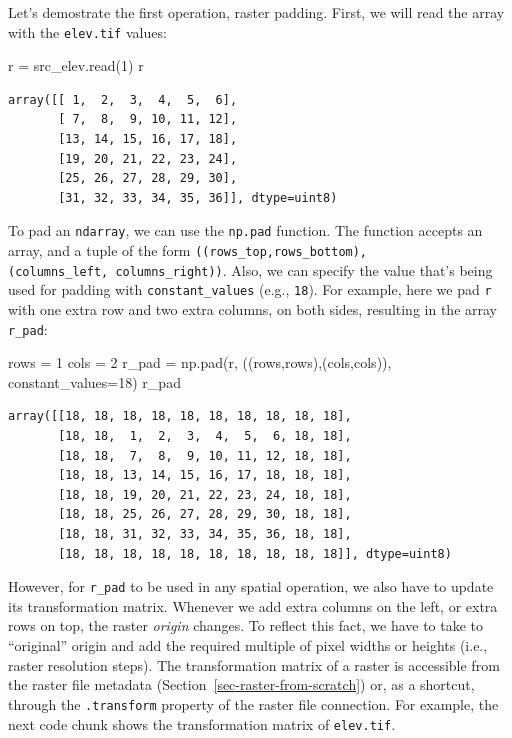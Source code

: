 \documentclass[
  letterpaper,
]{krantz}
\newenvironment{Shaded}{\begin{snugshade}}{\end{snugshade}}
\newcommand{\DecValTok}[1]{\textcolor[rgb]{0.68,0.00,0.00}{#1}}
\newcommand{\NormalTok}[1]{\textcolor[rgb]{0.00,0.23,0.31}{#1}}
\newcommand{\OperatorTok}[1]{\textcolor[rgb]{0.37,0.37,0.37}{#1}}
\begin{document}
Let's demostrate the first operation, raster padding. First, we will
read the array with the \texttt{elev.tif} values:

\begin{Shaded}
\begin{Highlighting}[]
\NormalTok{r }\OperatorTok{=}\NormalTok{ src\_elev.read(}\DecValTok{1}\NormalTok{)}
\NormalTok{r}
\end{Highlighting}
\end{Shaded}

\begin{verbatim}
array([[ 1,  2,  3,  4,  5,  6],
       [ 7,  8,  9, 10, 11, 12],
       [13, 14, 15, 16, 17, 18],
       [19, 20, 21, 22, 23, 24],
       [25, 26, 27, 28, 29, 30],
       [31, 32, 33, 34, 35, 36]], dtype=uint8)
\end{verbatim}

To pad an \texttt{ndarray}, we can use the \texttt{np.pad} function. The
function accepts an array, and a tuple of the form
\texttt{((rows\_top,rows\_bottom),(columns\_left,\ columns\_right))}.
Also, we can specify the value that's being used for padding with
\texttt{constant\_values} (e.g., \texttt{18}). For example, here we pad
\texttt{r} with one extra row and two extra columns, on both sides,
resulting in the array \texttt{r\_pad}:

\begin{Shaded}
\begin{Highlighting}[]
\NormalTok{rows }\OperatorTok{=} \DecValTok{1}
\NormalTok{cols }\OperatorTok{=} \DecValTok{2}
\NormalTok{r\_pad }\OperatorTok{=}\NormalTok{ np.pad(r, ((rows,rows),(cols,cols)), constant\_values}\OperatorTok{=}\DecValTok{18}\NormalTok{)}
\NormalTok{r\_pad}
\end{Highlighting}
\end{Shaded}

\begin{verbatim}
array([[18, 18, 18, 18, 18, 18, 18, 18, 18, 18],
       [18, 18,  1,  2,  3,  4,  5,  6, 18, 18],
       [18, 18,  7,  8,  9, 10, 11, 12, 18, 18],
       [18, 18, 13, 14, 15, 16, 17, 18, 18, 18],
       [18, 18, 19, 20, 21, 22, 23, 24, 18, 18],
       [18, 18, 25, 26, 27, 28, 29, 30, 18, 18],
       [18, 18, 31, 32, 33, 34, 35, 36, 18, 18],
       [18, 18, 18, 18, 18, 18, 18, 18, 18, 18]], dtype=uint8)
\end{verbatim}

However, for \texttt{r\_pad} to be used in any spatial operation, we
also have to update its transformation matrix. Whenever we add extra
columns on the left, or extra rows on top, the raster \emph{origin}
changes. To reflect this fact, we have to take to ``original'' origin
and add the required multiple of pixel widths or heights (i.e., raster
resolution steps). The transformation matrix of a raster is accessible
from the raster file metadata (Section~\ref{sec-raster-from-scratch})
or, as a shortcut, through the \texttt{.transform} property of the
raster file connection. For example, the next code chunk shows the
transformation matrix of \texttt{elev.tif}.
\end{document}
